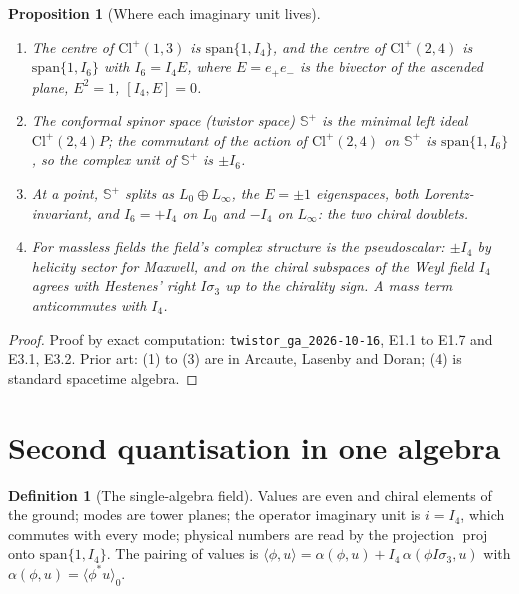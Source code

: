 \documentclass[11pt]{article}
\newtheorem{proposition}[theorem]{Proposition}
\theoremstyle{definition}
\newtheorem{definition}[theorem]{Definition}
\theoremstyle{plain}
\providecommand{\CS}{}\renewcommand{\CS}{{\mathbb{S}^{+}}}
\providecommand{\Cl}{}\renewcommand{\Cl}{\mathrm{Cl}}
\providecommand{\IS}{}\renewcommand{\IS}{I\sigma_3}
\providecommand{\proj}{}\renewcommand{\proj}{\operatorname{proj}}
\providecommand{\ip}{}\renewcommand{\ip}[2]{\langle #1, #2\rangle}
\begin{document}
\begin{proposition}[Where each imaginary unit lives]\label{c:field-theory.where-each-lives}
\begin{enumerate}
\item The centre of $\Cl^+(1,3)$ is $\mathrm{span}\{1, I_4\}$, and the centre of $\Cl^+(2,4)$ is $\mathrm{span}\{1, I_6\}$ with $I_6 = I_4E$, where $E = e_+e_-$ is the bivector of the ascended plane, $E^2 = 1$, $[I_4, E] = 0$.
\item The conformal spinor space (twistor space) $\CS$ is the minimal left ideal $\Cl^+(2,4)P$; the commutant of the action of $\Cl^+(2,4)$ on $\CS$ is $\mathrm{span}\{1, I_6\}$, so the complex unit of $\CS$ is $\pm I_6$.
\item At a point, $\CS$ splits as $L_0 \oplus L_\infty$, the $E = \pm 1$ eigenspaces, both Lorentz-invariant, and $I_6 = +I_4$ on $L_0$ and $-I_4$ on $L_\infty$: the two chiral doublets.
\item For massless fields the field's complex structure is the pseudoscalar: $\pm I_4$ by helicity sector for Maxwell, and on the chiral subspaces of the Weyl field $I_4$ agrees with Hestenes' right $\IS$ up to the chirality sign. A mass term anticommutes with $I_4$.
\end{enumerate}
\end{proposition}
\begin{proof}
Proof by exact computation: \texttt{twistor\_ga\_2026-10-16}, E1.1 to E1.7 and E3.1, E3.2. Prior art: (1) to (3) are in Arcaute, Lasenby and Doran; (4) is standard spacetime algebra.

\end{proof}

\section{Second quantisation in one algebra}

\begin{definition}[The single-algebra field]\label{c:obj.field-theory.single-algebra-field}
Values are even and chiral elements of the ground; modes are tower planes; the operator imaginary unit is $i = I_4$, which commutes with every mode; physical numbers are read by the projection $\proj$ onto $\mathrm{span}\{1, I_4\}$. The pairing of values is $\ip{\phi}{u} = \alpha(\phi, u) + I_4\,\alpha(\phi\IS, u)$ with $\alpha(\phi, u) = \langle \phi^*u\rangle_0$.
\end{definition}
\end{document}
